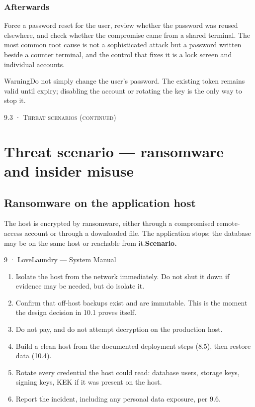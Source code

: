 \documentclass[11pt,a4paper,oneside]{book}
\begin{document}
\subsubsection*{Afterwards}
Force a password reset for the user, review whether the password was reused elsewhere, and check whether the compromise came from a shared terminal. The most common root cause is not a sophisticated attack but a password written beside a counter terminal, and the control that fixes it is a lock screen and individual accounts.

\begin{notebox}WarningDo not simply change the user's password. The existing token remains valid until expiry; disabling the account or rotating the key is the only way to stop it.\end{notebox}
\textsc{\small\color{crimson}9.3 · Threat scenarios (continued)}\par\medskip
\section*{Threat scenario — ransomware and insider misuse}
\subsection*{Ransomware on the application host}
The host is encrypted by ransomware, either through a compromised remote-access account or through a downloaded file. The application stops; the database may be on the same host or reachable from it.\textbf{Scenario.}

9 · LoveLaundry — System Manual

\begin{enumerate}
\item Isolate the host from the network immediately. Do not shut it down if evidence may be needed, but do isolate it.
\item Confirm that off-host backups exist and are immutable. This is the moment the design decision in 10.1 proves itself.
\item Do not pay, and do not attempt decryption on the production host.
\item Build a clean host from the documented deployment steps (8.5), then restore data (10.4).
\item Rotate every credential the host could read: database users, storage keys, signing keys, KEK if it was present on the host.
\item Report the incident, including any personal data exposure, per 9.6.
\end{enumerate}
\end{document}

